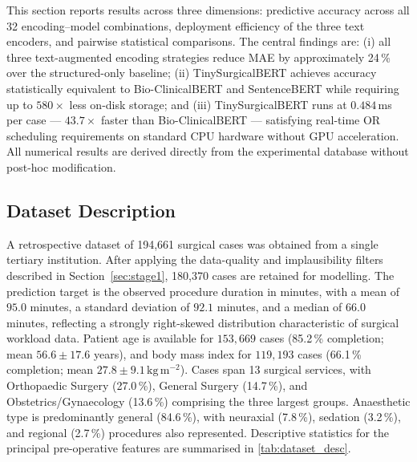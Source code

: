 
This section reports results across three dimensions: predictive accuracy across all 32 encoding–model combinations, deployment efficiency of the three text encoders, and pairwise statistical comparisons. The central findings are: (i) all three text-augmented encoding strategies reduce MAE by approximately 24\,\% over the structured-only baseline; (ii) TinySurgicalBERT achieves accuracy statistically equivalent to Bio-ClinicalBERT and SentenceBERT while requiring up to $580\times$ less on-disk storage; and (iii) TinySurgicalBERT runs at $0.484$\,ms per case — $43.7\times$ faster than Bio-ClinicalBERT — satisfying real-time OR scheduling requirements on standard CPU hardware without GPU acceleration. All numerical results are derived directly from the experimental database without post-hoc modification.

\subsection{Dataset Description}
\label{sec:dataset_desc}

A retrospective dataset of 194{,}661 surgical cases was obtained from a single tertiary institution. After applying the data-quality and implausibility filters described in Section~\ref{sec:stage1}, 180{,}370 cases are retained for modelling. The prediction target is the observed procedure duration in minutes, with a mean of $95.0$ minutes, a standard deviation of $92.1$ minutes, and a median of $66.0$ minutes, reflecting a strongly right-skewed distribution characteristic of surgical workload data. Patient age is available for $153{,}669$ cases (85.2\,\% completion; mean $56.6 \pm 17.6$ years), and body mass index for $119{,}193$ cases (66.1\,\% completion; mean $27.8 \pm 9.1\,\text{kg}\,\text{m}^{-2}$). Cases span 13 surgical services, with Orthopaedic Surgery (27.0\,\%), General Surgery (14.7\,\%), and Obstetrics/Gynaecology (13.6\,\%) comprising the three largest groups. Anaesthetic type is predominantly general (84.6\,\%), with neuraxial (7.8\,\%), sedation (3.2\,\%), and regional (2.7\,\%) procedures also represented. Descriptive statistics for the principal pre-operative features are summarised in \cref{tab:dataset_desc}.

